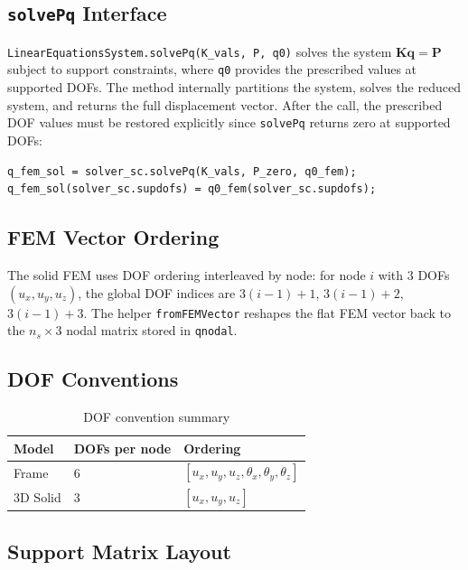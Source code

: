 \documentclass{article}
\begin{document}
\subsection{\texttt{solvePq} Interface}

\texttt{LinearEquationsSystem.solvePq(K\_vals, P, q0)} solves the
system $\bm{K}\bm{q} = \bm{P}$ subject to support constraints, where
\texttt{q0} provides the prescribed values at supported DOFs.  The method
internally partitions the system, solves the reduced system, and returns
the full displacement vector.  After the call, the prescribed DOF values
must be restored explicitly since \texttt{solvePq} returns zero at
supported DOFs:
\begin{lstlisting}[caption={Restoring prescribed boundary values after solvePq}]
q_fem_sol = solver_sc.solvePq(K_vals, P_zero, q0_fem);
q_fem_sol(solver_sc.supdofs) = q0_fem(solver_sc.supdofs);
\end{lstlisting}

\subsection{FEM Vector Ordering}

The solid FEM uses DOF ordering interleaved by node: for node $i$ with 3 DOFs
$(u_x, u_y, u_z)$, the global DOF indices are $3(i-1)+1$, $3(i-1)+2$,
$3(i-1)+3$.  The helper \texttt{fromFEMVector} reshapes the flat FEM vector
back to the $n_s \times 3$ nodal matrix stored in \texttt{qnodal}.

\subsection{DOF Conventions}

\begin{table}[h]
\centering
\caption{DOF convention summary}
\begin{tabular}{@{}lll@{}}
\toprule
Model       & DOFs per node & Ordering \\
\midrule
Frame       & 6             & $[u_x, u_y, u_z, \theta_x, \theta_y, \theta_z]$ \\
3D Solid    & 3             & $[u_x, u_y, u_z]$ \\
\bottomrule
\end{tabular}
\end{table}

\subsection{Support Matrix Layout}
\end{document}
